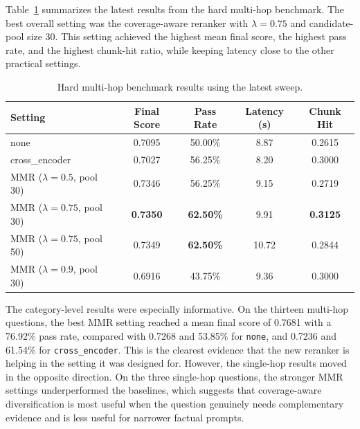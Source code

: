 \documentclass[sigconf]{acmart}
\begin{document}
Table~\ref{tab:hard-results} summarizes the latest results from the hard multi-hop benchmark. The best overall setting was the coverage-aware reranker with \(\lambda = 0.75\) and candidate-pool size 30. This setting achieved the highest mean final score, the highest pass rate, and the highest chunk-hit ratio, while keeping latency close to the other practical settings.

\begin{table}[t]
  \caption{Hard multi-hop benchmark results using the latest sweep.}
  \label{tab:hard-results}
  \centering
  \begin{tabular}{lcccc}
    \toprule
    Setting & Final Score & Pass Rate & Latency (s) & Chunk Hit \\
    \midrule
    none & 0.7095 & 50.00\% & 8.87 & 0.2615 \\
    cross\_encoder & 0.7027 & 56.25\% & 8.20 & 0.3000 \\
    MMR (\(\lambda=0.5\), pool 30) & 0.7346 & 56.25\% & 9.15 & 0.2719 \\
    MMR (\(\lambda=0.75\), pool 30) & \textbf{0.7350} & \textbf{62.50\%} & 9.91 & \textbf{0.3125} \\
    MMR (\(\lambda=0.75\), pool 50) & 0.7349 & \textbf{62.50\%} & 10.72 & 0.2844 \\
    MMR (\(\lambda=0.9\), pool 30) & 0.6916 & 43.75\% & 9.36 & 0.3000 \\
    \bottomrule
  \end{tabular}
\end{table}

The category-level results were especially informative. On the thirteen multi-hop questions, the best MMR setting reached a mean final score of 0.7681 with a 76.92\% pass rate, compared with 0.7268 and 53.85\% for \texttt{none}, and 0.7236 and 61.54\% for \texttt{cross\_encoder}. This is the clearest evidence that the new reranker is helping in the setting it was designed for. However, the single-hop results moved in the opposite direction. On the three single-hop questions, the stronger MMR settings underperformed the baselines, which suggests that coverage-aware diversification is most useful when the question genuinely needs complementary evidence and is less useful for narrower factual prompts.
\end{document}
